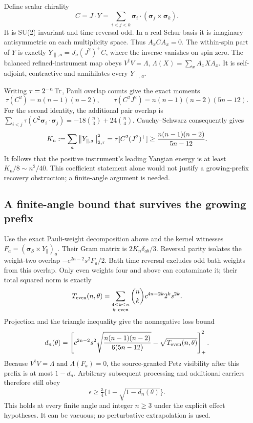 Define scalar chirality
\[
 C=J\cdot Y=\sum_{i<j<k}
 \boldsymbol\sigma_i\cdot(\boldsymbol\sigma_j\times\boldsymbol\sigma_k).
\]
It is SU(2) invariant and time-reversal odd. In a real Schur basis it is
imaginary antisymmetric on each multiplicity space. Thus $A_xCA_x=0$.
The within-spin part of $Y$ is exactly
$Y_{\parallel,a}=J_a(J^2)^+C$, where the inverse vanishes on spin zero.
The balanced refined-instrument map obeys
$V^\dagger V=\Lambda$, $\Lambda(X)=\sum_xA_xXA_x$.
It is self-adjoint, contractive and annihilates every $Y_{\parallel,a}$.

Writing $\tau=2^{-n}\operatorname{Tr}$, Pauli overlap counts give the exact moments
\[
 \tau(C^2)=n(n-1)(n-2),\qquad
 \tau(C^2J^2)=n(n-1)(n-2)(5n-12).
\]
For the second identity, the additional pair overlap is
$\sum_{i<j}\tau(C^2\boldsymbol\sigma_i\cdot\boldsymbol\sigma_j)
=-18\binom n3+24\binom n4$.
Cauchy--Schwarz consequently gives
\[
 K_n:=\sum_a\left\lVert Y_{\parallel,a}\right\rVert_{2,\tau}^2
 =\tau[C^2(J^2)^+]\ge\frac{n(n-1)(n-2)}{5n-12}.
\]
It follows that the positive instrument's leading Yangian energy is at
least $K_n/8\sim n^2/40$. This coefficient statement alone would not
justify a growing-prefix recovery obstruction; a finite-angle argument
is needed.

\subsection{A finite-angle bound that survives the growing prefix}
Use the exact Pauli-weight decomposition above and the kernel witnesses
$F_a=(\boldsymbol\sigma_S\times Y_\parallel)_a$.
Their Gram matrix is $2K_n\delta_{ab}/3$. Reversal parity isolates the
weight-two overlap $-c^{2n-2}s^2F_a/2$. Bath time reversal excludes odd
bath weights from this overlap. Only even weights four and above can
contaminate it; their total squared norm is exactly
\[
 T_{\rm even}(n,\theta)=
 \sum_{\substack{4\le k\le n\\k\ \rm even}}
 \binom nk c^{4n-2k}2^ks^{2k}.
\]
Projection and the triangle inequality give the nonnegative loss bound
\begin{equation}
 d_n(\theta)=\left[
 c^{2n-2}s^2\sqrt{\frac{n(n-1)(n-2)}{6(5n-12)}}
 -\sqrt{T_{\rm even}(n,\theta)}\right]_+^2.\label{eq:chiralityloss}
\end{equation}
Because $V^\dagger V=\Lambda$ and $\Lambda(F_a)=0$, the source-granted
Petz visibility after this prefix is at most $1-d_n$. Arbitrary subsequent
processing and additional carriers therefore still obey
\[
 \epsilon\ge\tfrac34\{1-\sqrt{1-d_n(\theta)}\}.
\]
This holds at every finite angle and integer $n\ge3$ under the explicit
effect hypotheses. It can be vacuous; no perturbative extrapolation is used.

